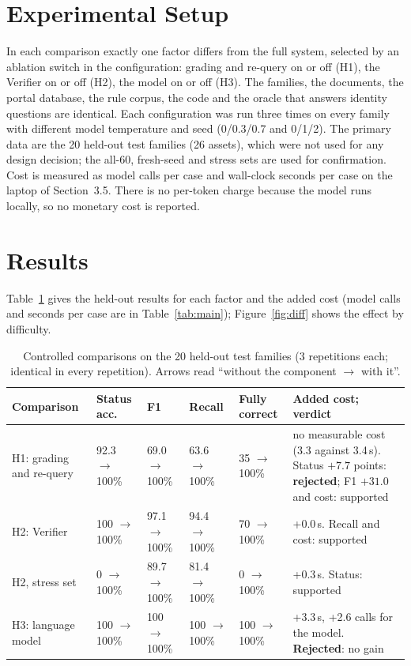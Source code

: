 \documentclass[12pt,a4paper,oneside]{report}
\begin{document}
\section{Experimental Setup}
In each comparison exactly one factor differs from the full system, selected by an ablation switch in the configuration: grading and re-query on or off (H1), the Verifier on or off (H2), the model on or off (H3). The families, the documents, the portal database, the rule corpus, the code and the oracle that answers identity questions are identical. Each configuration was run three times on every family with different model temperature and seed (0/0.3/0.7 and 0/1/2). The primary data are the 20 held-out test families (26 assets), which were not used for any design decision; the all-60, fresh-seed and stress sets are used for confirmation. Cost is measured as model calls per case and wall-clock seconds per case on the laptop of Section~3.5. There is no per-token charge because the model runs locally, so no monetary cost is reported.

\section{Results}
Table~\ref{tab:exp} gives the held-out results for each factor and the added cost (model calls and seconds per case are in Table~\ref{tab:main}); Figure~\ref{fig:diff} shows the effect by difficulty.

\begin{table}[H]
\centering\footnotesize{}
\caption[Controlled comparisons on the held-out families]{Controlled comparisons on the 20 held-out test families (3 repetitions each; identical in every repetition). Arrows read ``without the component $\to$ with it''.}\label{tab:exp}
\renewcommand{\arraystretch}{1.15}
\begin{tabular}{@{}p{2.5cm}p{1.8cm}p{1.8cm}p{1.8cm}p{1.6cm}p{3.6cm}@{}}
\toprule
\textbf{Comparison} & \textbf{Status acc.} & \textbf{F1} & \textbf{Recall} & \textbf{Fully correct} & \textbf{Added cost; verdict} \\ \midrule
H1: grading and re-query & 92.3 $\to$ 100\% & 69.0 $\to$ 100\% & 63.6 $\to$ 100\% & 35 $\to$ 100\% & no measurable cost (3.3 against 3.4\,s). Status $+7.7$ points: \textbf{rejected}; F1 $+31.0$ and cost: supported \\
H2: Verifier & 100 $\to$ 100\% & 97.1 $\to$ 100\% & 94.4 $\to$ 100\% & 70 $\to$ 100\% & +0.0\,s. Recall and cost: supported \\
H2, stress set & 0 $\to$ 100\% & 89.7 $\to$ 100\% & 81.4 $\to$ 100\% & 0 $\to$ 100\% & +0.3\,s. Status: supported \\
H3: language model & 100 $\to$ 100\% & 100 $\to$ 100\% & 100 $\to$ 100\% & 100 $\to$ 100\% & +3.3\,s, +2.6 calls for the model. \textbf{Rejected}: no gain \\ \bottomrule
\end{tabular}
\end{table}
\end{document}

